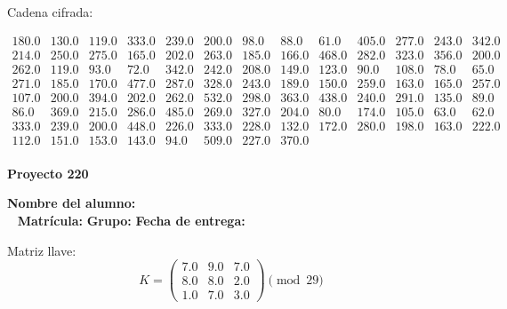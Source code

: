 \documentclass[12pt]{article}
\begin{document}
Cadena cifrada:
\begin{center}
$\begin{array}{lllllllllllll}
180.0 & 130.0 & 119.0 & 333.0 & 239.0 & 200.0 & 98.0 & 88.0 & 61.0 & 405.0 & 277.0 & 243.0 & 342.0\\
214.0 & 250.0 & 275.0 & 165.0 & 202.0 & 263.0 & 185.0 & 166.0 & 468.0 & 282.0 & 323.0 & 356.0 & 200.0\\
262.0 & 119.0 & 93.0 & 72.0 & 342.0 & 242.0 & 208.0 & 149.0 & 123.0 & 90.0 & 108.0 & 78.0 & 65.0\\
271.0 & 185.0 & 170.0 & 477.0 & 287.0 & 328.0 & 243.0 & 189.0 & 150.0 & 259.0 & 163.0 & 165.0 & 257.0\\
107.0 & 200.0 & 394.0 & 202.0 & 262.0 & 532.0 & 298.0 & 363.0 & 438.0 & 240.0 & 291.0 & 135.0 & 89.0\\
86.0 & 369.0 & 215.0 & 286.0 & 485.0 & 269.0 & 327.0 & 204.0 & 80.0 & 174.0 & 105.0 & 63.0 & 62.0\\
333.0 & 239.0 & 200.0 & 448.0 & 226.0 & 333.0 & 228.0 & 132.0 & 172.0 & 280.0 & 198.0 & 163.0 & 222.0\\
112.0 & 151.0 & 153.0 & 143.0 & 94.0 & 509.0 & 227.0 & 370.0\\
\end{array}$
\end{center}

\newpage


\textbf{Proyecto 220}

\textbf{Nombre del alumno:} \underline{\hspace{13cm}}\\\
\vspace{1cm}
\textbf{Matrícula:} \underline{\hspace{4cm}} \hspace{1cm}
\textbf{Grupo:} \underline{\hspace{2cm}}
\textbf{Fecha de entrega:} \underline{\hspace{2cm}}

\medskip

Matriz llave:
\[
K = \begin{pmatrix}
7.0 & 9.0 & 7.0\\
8.0 & 8.0 & 2.0\\
1.0 & 7.0 & 3.0
\end{pmatrix} \pmod{29}
\]
\end{document}
